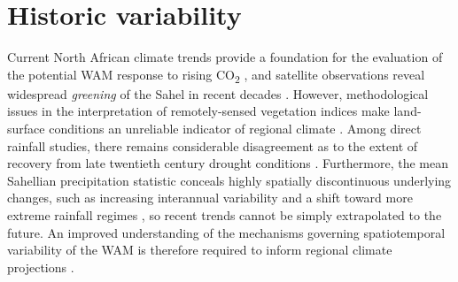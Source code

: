 \documentclass[a4paper]{article}
\begin{document}
\section*{Historic variability}
Current North African climate trends provide a foundation for the evaluation of the potential WAM response to rising CO\textsubscript{2} \parencite{redelsperger2006african}, and satellite observations reveal widespread \emph{greening} of the Sahel in recent decades \parencite{olsson2005recent, dardel2014re}.
However, methodological issues in the interpretation of remotely-sensed vegetation indices make land-surface conditions an unreliable indicator of regional climate \parencite{fensholt2013assessing, dardel2014rain}.
Among direct rainfall studies, there remains considerable disagreement as to the extent of recovery from late twentieth century drought conditions \parencite{nicholson2005question, nicholson2013west}.
Furthermore, the mean Sahellian precipitation statistic conceals highly spatially discontinuous underlying changes, such as increasing interannual variability and a shift toward more extreme rainfall regimes \parencite{nicholson2013west, lebel2009recent, panthou2014recent}, so recent trends cannot be simply extrapolated to the future.
An improved understanding of the mechanisms governing spatiotemporal variability of the WAM is therefore required to inform regional climate projections \parencite{redelsperger2006african}.
\end{document}
